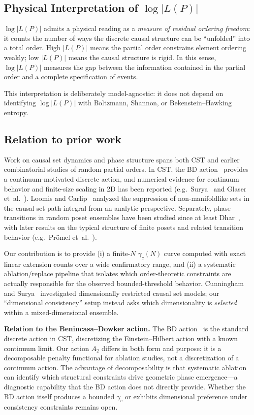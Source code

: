 \documentclass[12pt,a4paper]{article}
\begin{document}
\subsection{Physical Interpretation of $\log|L(P)|$}

$\log|L(P)|$ admits a physical reading as a \emph{measure of residual ordering
freedom}: it counts the number of ways the discrete causal structure can be
``unfolded'' into a total order. High $|L(P)|$ means the partial order
constrains element ordering weakly; low $|L(P)|$ means the causal structure is
rigid. In this sense, $\log|L(P)|$ measures the gap between the information
contained in the partial order and a complete specification of events.

This interpretation is deliberately model-agnostic: it does not depend on
identifying $\log|L(P)|$ with Boltzmann, Shannon, or Bekenstein--Hawking
entropy.

\subsection{Relation to prior work}

Work on causal set dynamics and phase structure spans both CST and earlier
combinatorial studies of random partial orders. In CST, the BD
action~\cite{benincasa2010,benincasa2011} provides a continuum-motivated
discrete action, and numerical evidence for continuum behavior and finite-size
scaling in 2D has been reported (e.g.\ Surya~\cite{surya2012} and
Glaser et~al.~\cite{glaser2018}). Loomis and Carlip~\cite{loomis2018} analyzed the
suppression of non-manifoldlike sets in the causal set path integral from an
analytic perspective. Separately, phase transitions in random poset ensembles
have been studied since at least Dhar~\cite{dhar1978}, with later results on the
typical structure of finite posets and related transition behavior (e.g.\
Pr\"omel et~al.~\cite{promel2001}).

Our contribution is to provide (i) a finite-$N$ $\gamma_c(N)$ curve computed
with exact linear extension counts over a wide confirmatory range, and (ii) a
systematic ablation/replace pipeline that isolates which order-theoretic
constraints are actually responsible for the observed bounded-threshold
behavior. Cunningham and Surya~\cite{cunningham2020} investigated dimensionally
restricted causal set models; our ``dimensional consistency'' setup instead
asks which dimensionality is \emph{selected} within a mixed-dimensional ensemble.

\textbf{Relation to the Benincasa--Dowker action.}
The BD action~\cite{benincasa2010,benincasa2011} is the standard discrete action
in CST, discretizing the Einstein--Hilbert action with a known continuum limit.
Our action $A_2$ differs in both form and purpose: it is a decomposable penalty
functional for ablation studies, not a discretization of a continuum action. The
advantage of decomposability is that systematic ablation can identify which
structural constraints drive geometric phase emergence---a diagnostic capability
that the BD action does not directly provide. Whether the BD action itself
produces a bounded $\gamma_c$ or exhibits dimensional preference under
consistency constraints remains open.
\end{document}
